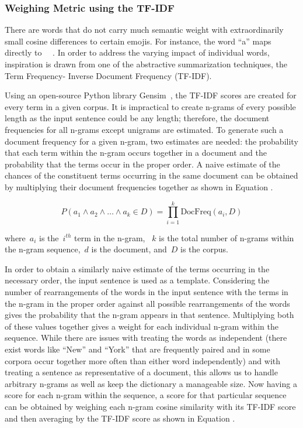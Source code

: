 \documentclass{article}[10]
\newcommand*{\img}[1]{%
  \raisebox{-.3\baselineskip}{%
    \texttt{[image: \#1]}%
  }%
}
\begin{document}
\subsubsection{Weighing Metric using the TF-IDF\label{sec:TF-IDFWeighing}}

There are words that do not carry much semantic weight with
extraordinarily small cosine differences to certain emojis. For
instance, the word ``a'' maps directly to~~\img{emojis/1f4af.png}. In order to address the
varying impact of individual words, inspiration is drawn from one of the
abstractive summarization techniques, the Term Frequency- Inverse
Document Frequency (TF-IDF).

Using an open-source Python library Gensim~\cite{gensim}, the
TF-IDF scores are created for every term in a given corpus. It is
impractical to create n-grams of every possible length as the input
sentence could be any length; therefore, the document frequencies for
all n-grams except unigrams are estimated. To generate such a document
frequency for a given n-gram, two estimates are needed: the probability
that each term within the n-gram occurs together in a document and the
probability that the terms occur in the proper order. A naive estimate
of the chances of the constituent terms occurring in the same document
can be obtained by multiplying their document frequencies together as
shown in Equation .

\begin{equation}
  P(a_{1} \land a_{2} \land \ldots \land a_{k} \in D) = \prod_{i=1}^{k}\textrm{DocFreq}(a_{i}, D) \label{eq:TF-IDFWeighing}
\end{equation}

where~\(a_{i}\) is the~\(i^{th}\) term in the n-gram,
~\(k\) is the total number of n-grams within the
n-gram sequence,~\(d\) is the document,
and~\(D\) is the corpus.

In order to obtain a similarly naive estimate of the terms occurring in
the necessary order, the input sentence is used as a template.
Considering the number of rearrangements of the words in the input
sentence with the terms in the n-gram in the proper order against all
possible rearrangements of the words gives the probability that the
n-gram appears in that sentence. Multiplying both of these values
together gives a weight for each individual n-gram within the sequence.
While there are issues with treating the words as independent (there
exist words like ``New'' and ``York'' that are frequently paired and in
some corpora occur together more often than either word independently)
and with treating a sentence as representative of a document, this
allows us to handle arbitrary n-grams as well as keep the dictionary a
manageable size. Now having a score for each n-gram within the sequence,
a score for that particular sequence can be obtained by weighing each
n-gram cosine similarity with its TF-IDF score and then averaging by the
TF-IDF score as shown in Equation .
\end{document}
